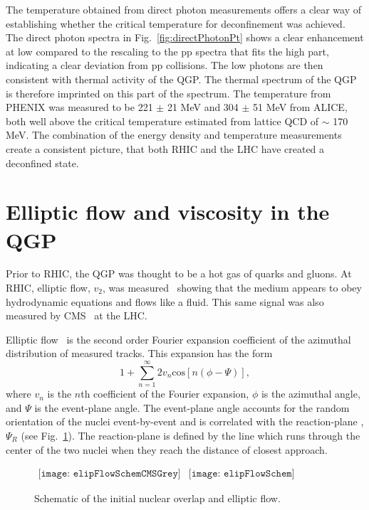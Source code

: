     The temperature obtained from direct photon measurements offers a clear
      way of establishing whether the critical temperature for deconfinement
      was achieved. 
    The direct photon \pt{} spectra in Fig.~\ref{fig:directPhotonPt} shows a 
      clear enhancement at low \pt{} compared to the rescaling to the pp 
      spectra that fits the high \pt{} part, indicating a clear deviation from 
      pp collisions.
    The low \pt{} photons are then consistent with thermal activity of
      the QGP.
    The thermal spectrum of the QGP is therefore imprinted on this part of 
      the spectrum.
    The temperature from PHENIX was measured to be 221 $\pm$ 21 MeV and 
      304 $\pm$ 51 MeV from ALICE, both well above the critical temperature
      estimated from lattice QCD of $\sim$ 170 MeV.
    The combination of the energy density and temperature measurements
      create a consistent picture, that both RHIC and the LHC have created a 
      deconfined state.

  \section{Elliptic flow and viscosity in the QGP \label{sec:elipFlow}}
    Prior to RHIC, the QGP was thought to be a hot gas of quarks and gluons.
    At RHIC, elliptic flow, $v_{2}$, was measured~\cite{Ackermann:2000tr} showing that the medium 
      appears to obey hydrodynamic equations and flows like a fluid.
    This same signal was also measured by CMS~\cite{cmsFlow} at the LHC. 

    Elliptic flow~\cite{Ollitrault:1992bk,Sorensen:2009cz} is the second order Fourier expansion coefficient  
      of the azimuthal distribution of measured tracks.
    This expansion has the form
    \begin{equation}
      1+\sum^{\infty}_{n=1}2v_{n}\mathrm{cos}\left[n\left(\phi-\Psi\right)\right],
      \label{eg:v2Expand}
    \end{equation}
      where $v_{n}$ is the $n$th coefficient of the Fourier expansion, $\phi$
      is the azimuthal angle, and $\Psi$ is the event-plane angle.
    The event-plane angle \DIFaddbegin {}\DIFaddend accounts for the random orientation of the 
      nuclei event-by-event and is correlated with the reaction-plane
      , $\Psi_{R}$ (see Fig.~\ref{fig:elipSchem}).
    The reaction-plane is defined by the line which runs through the center
      of the two nuclei when they reach the distance of closest approach. 
    \begin{figure}[!Hhbt]
      \centering
      $ \begin{array}{cc}
      \texttt{[image: elipFlowSchemCMSGrey]} &
      \texttt{[image: elipFlowSchem]}
      \end{array} $
      \caption{Schematic of the initial nuclear overlap and elliptic flow.}
      \label{fig:elipSchem}
    \end{figure}

